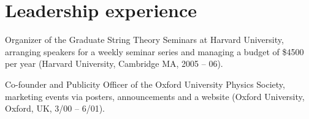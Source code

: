 \documentclass[letterpaper,10pt,notopicbreak,titleabove,plain]{simplecv}
\begin{document}
\section{Leadership experience}
\begin{topic}
	\item Organizer of the Graduate String Theory Seminars at Harvard University, arranging speakers for a weekly seminar series and managing a budget of \$4500 per year (Harvard University, Cambridge MA, 2005 -- 06).
	\item Co-founder and Publicity Officer of the Oxford University Physics Society, marketing events via posters, announcements and a website (Oxford University, Oxford, UK, 3/00 -- 6/01).
\end{topic}




%
%
\end{document}
